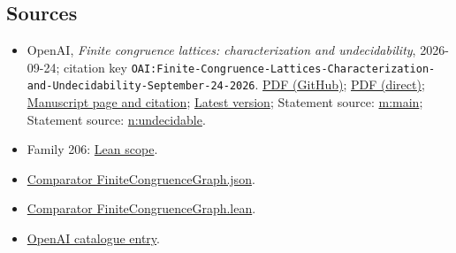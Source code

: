 \documentclass[11pt]{article}
\begin{document}
\subsection{Sources}
\begin{itemize}
\item OpenAI, \emph{Finite congruence lattices: characterization and undecidability}, 2026-09-24; citation key \texttt{OAI:Finite-Congruence-Lattices-Characterization-and-Undecidability-September-24-2026}. \href{https://github.com/openai/math/blob/adc7f1241b42e322a6451854ab7e4b4c146bf78a/preprints/Finite-Congruence-Lattices-Characterization-and-Undecidability-September-24-2026/paper.pdf}{PDF (GitHub)}; \href{https://github.com/openai/math/raw/adc7f1241b42e322a6451854ab7e4b4c146bf78a/preprints/Finite-Congruence-Lattices-Characterization-and-Undecidability-September-24-2026/paper.pdf}{PDF (direct)}; \href{https://github.com/openai/math/blob/adc7f1241b42e322a6451854ab7e4b4c146bf78a/preprints/Finite-Congruence-Lattices-Characterization-and-Undecidability-September-24-2026/README.md}{Manuscript page and citation}; \href{https://github.com/openai/math/blob/main/preprints/Finite-Congruence-Lattices-Characterization-and-Undecidability-September-24-2026/paper.pdf}{Latest version}; Statement source: \href{https://github.com/openai/math/blob/adc7f1241b42e322a6451854ab7e4b4c146bf78a/preprints/Finite-Congruence-Lattices-Characterization-and-Undecidability-September-24-2026/build/sections/introduction.tex\#L60}{m:main}; Statement source: \href{https://github.com/openai/math/blob/adc7f1241b42e322a6451854ab7e4b4c146bf78a/preprints/Finite-Congruence-Lattices-Characterization-and-Undecidability-September-24-2026/build/sections/diophantine.tex\#L154}{n:undecidable}.
\item Family 206: \href{https://github.com/openai/math/blob/adc7f1241b42e322a6451854ab7e4b4c146bf78a/lean/docs/206.md}{Lean scope}.
\item \href{https://github.com/openai/math/blob/adc7f1241b42e322a6451854ab7e4b4c146bf78a/lean/ComparatorChallenges/FiniteCongruenceGraph.json}{Comparator FiniteCongruenceGraph.json}.
\item \href{https://github.com/openai/math/blob/adc7f1241b42e322a6451854ab7e4b4c146bf78a/lean/ComparatorChallenges/FiniteCongruenceGraph.lean}{Comparator FiniteCongruenceGraph.lean}.
\item \href{https://github.com/openai/math/blob/adc7f1241b42e322a6451854ab7e4b4c146bf78a/CONTENTS.md}{OpenAI catalogue entry}.
\end{itemize}
\end{document}
